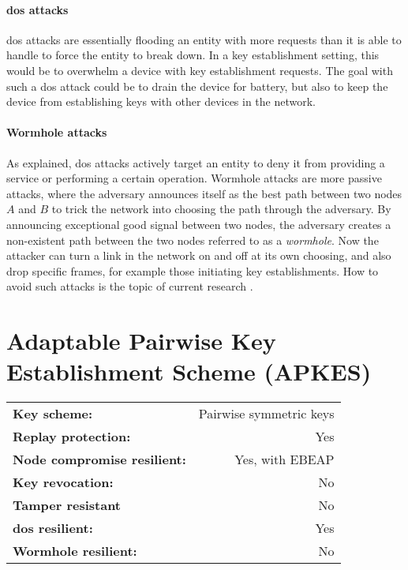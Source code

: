 \paragraph{\gls{dos} attacks}

\gls{dos} attacks are essentially flooding an entity with more requests than it is able to handle to force the entity to break down. In a key establishment setting, this would be to overwhelm a device with key establishment requests. The goal with such a \gls{dos} attack could be to drain the device for battery, but also to keep the device from establishing keys with other devices in the network.

\paragraph{Wormhole attacks}

As explained, \gls{dos} attacks actively target an entity to deny it from providing a service or performing a certain operation. Wormhole attacks are more passive attacks, where the adversary announces itself as the best path between two nodes $A$ and $B$ to trick the network into choosing the path through the adversary. By announcing exceptional good signal between two nodes, the adversary creates a non-existent path between the two nodes referred to as a \emph{wormhole}. Now the attacker can turn a link in the network on and off at its own choosing, and also drop specific frames, for example those initiating key establishments. How to avoid such attacks is the topic of current research \cite{krentz20146lowpan}.

\newpage

\section{Adaptable Pairwise Key Establishment Scheme (APKES)}

\begin{table}[h]
\begin{tabular}{lr}
\textbf{Key scheme:} & Pairwise symmetric keys  \\
\textbf{Replay protection:}	 & Yes  \\
\textbf{Node compromise resilient:} & Yes, with EBEAP  \\
\textbf{Key revocation:} & No \\
\textbf{Tamper resistant} & No \\
\textbf{\gls{dos} resilient:} & Yes \\
\textbf{Wormhole resilient:} & No \\
\end{tabular}
\end{table}



